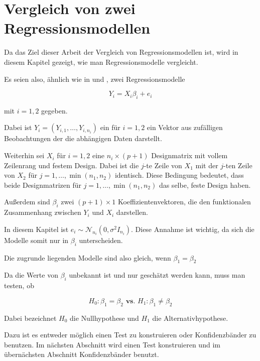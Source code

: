 \documentclass[12pt,a4paper]{article}
\theoremstyle{definition}
\theoremstyle{definition}
\theoremstyle{definition}
\theoremstyle{definition}
\begin{document}
\newpage
\section{Vergleich von zwei Regressionsmodellen}
\label{Vergleich von zwei Regressionsmodellen}
Da das Ziel dieser Arbeit der Vergleich von Regressionsmodellen ist, wird in diesem Kapitel gezeigt, wie man Regressionsmodelle vergleicht. 

Es seien also, ähnlich wie in \cite[113]{Liu64} und \cite[178]{Liu64}, zwei Regressionsmodelle 

\begin{equation}
\label{Grundmodell_Hypothesentest}
Y_{i} = X_{i} \beta_{i} + e_{i}
\end{equation}

mit $i = 1,2$ gegeben. 

Dabei ist $Y_{i} = (Y_{i,1}, \ldots, Y_{i,n_i})$ ein für $i=1,2$ ein Vektor aus zufälligen Beobachtungen der die abhängigen Daten darstellt.

Weiterhin sei $X_i$ für $i=1,2$ eine $n_i \times (p+1)$ Designmatrix mit vollem Zeilenrang und festem Design. Dabei ist die $j$-te Zeile von $X_1$ mit der $j$-ten Zeile von $X_2$ für $j=1,\ldots, \min(n_1, n_2)$ identisch. Diese Bedingung bedeutet, dass beide Designmatrizen für $j=1, \ldots, \min(n_1, n_2)$ das selbe, feste Design haben.

Außerdem sind $\beta_i$ zwei $(p+1) \times 1$ Koeffizientenvektoren, die den funktionalen Zusammenhang zwischen $Y_i$ und $X_i$ darstellen.

In diesem Kapitel ist $e_i \sim \mathscr{N}_{n_i}(0,\sigma^2 I_{n_i})$. Diese Annahme ist wichtig, da sich die Modelle somit nur in $\beta_i$ unterscheiden.

Die zugrunde liegenden Modelle sind also gleich, wenn $\beta_{1}=\beta_{2}$ 

Da die Werte von $\beta_{i}$ unbekannt ist und nur geschätzt werden kann, muss man testen, ob 

\begin{equation}
H_{0} : \beta_{1} = \beta_{2}  \textbf{ vs. }  H_{1} : \beta_{1} \neq \beta_{2} \label{Hypothese}
\end{equation}

Dabei bezeichnet $H_{0}$ die \gls{Nullhypothese} und $H_{1}$ die Alternativhypothese.

Dazu ist es entweder möglich einen Test zu konstruieren oder Konfidenzbänder zu benutzen. Im nächsten Abschnitt wird einen Test konstruieren und im übernächsten Abschnitt Konfidenzbänder benutzt.
\end{document}

